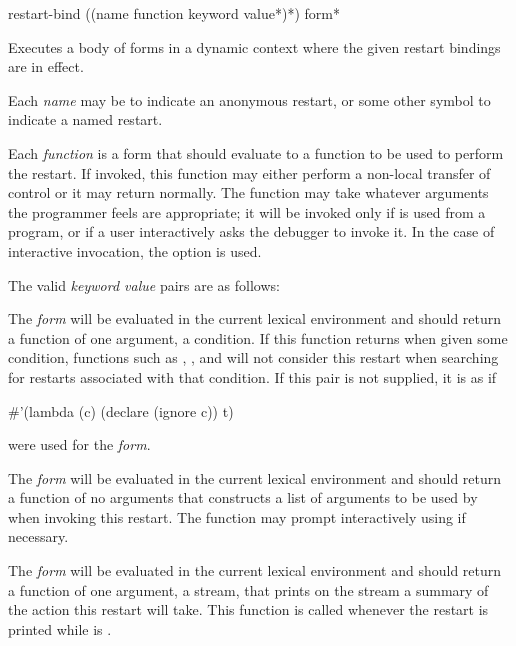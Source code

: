 \begin{defmac}
restart-bind ({(name function {keyword value}*)}*) {form}*

  Executes a body of forms in a dynamic context where the given restart
  bindings are in effect.

  Each \emph{name} may be  to indicate an anonymous restart, or some other symbol
  to indicate a named restart.

  Each \emph{function} is a form that
  should evaluate to a function to be used to perform the restart.
  If invoked, this function may either perform a non-local transfer of control
  or it may return normally. The function may take whatever arguments the
  programmer feels are appropriate; it will be invoked only if 
  is used from a program, or if a user interactively asks the debugger to
  invoke it. In the case of interactive invocation, the 
  option is used.


  The valid \emph{keyword value} pairs are as follows:
\begin{flushdesc}
\item[\cd{:test-function \emph{form}}]

    The \emph{form} will be evaluated in the current lexical environment and
     should return a function of one argument, a condition.
    If this function returns  when given some condition, functions such as
, , and 
will not consider this restart when searching for restarts associated with
that condition.  If this pair is not supplied, it is as if
\begin{lisp}
\#'(lambda (c) (declare (ignore c)) t)
\end{lisp}
were used for the \emph{form}.

\item[\cd{:interactive-function \emph{form}}]

     The \emph{form} will be evaluated in the current lexical environment and
     should return a function of no arguments that constructs a list
     of arguments to be used by  when invoking
     this restart. The function may prompt interactively using 
     if necessary.

\item[\cd{:report-function \emph{form}}]

     The \emph{form} will be evaluated in the current lexical environment and
     should return a function of one argument, a stream, that prints on
     the stream a summary of the action this restart will take. This
     function is called whenever the restart is printed while 
     is .
\end{flushdesc}
\end{defmac}

